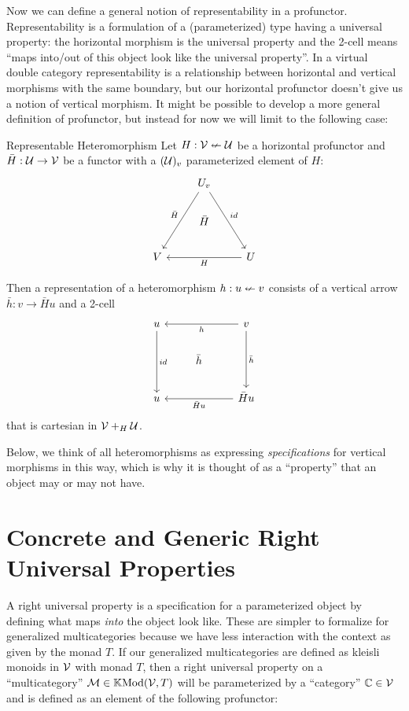 \documentclass{article}
\begin{document}
Now we can define a general notion of representability in a
profunctor.
%
Representability is a formulation of a (parameterized) type having a
universal property: the horizontal morphism is the universal property
and the 2-cell means ``maps into/out of this object look like the
universal property''.
%
In a virtual double category representability is a relationship
between horizontal and vertical morphisms with the same boundary, but
our horizontal profunctor doesn't give us a notion of vertical
morphism.
%
It might be possible to develop a more general definition of
profunctor, but instead for now we will limit to the following case:

\begin{definition}{Representable Heteromorphism}
  Let $H : \mathcal V \nleftarrow \mathcal U$ be a horizontal profunctor and
  $\bar H : \mathcal U \to \mathcal V$ be a functor with a $(\mathcal U)_v$
  parameterized element of $H$:
  \[
  \begin{tikzcd}
 & U_v \arrow[ldd, "\bar H"'] \arrow[rdd, "id"] &  \\
 & \bar H &  \\
V &  & U \arrow[ll, "H"]
\end{tikzcd}
  \]

  Then a representation of a heteromorphism $h : u \nleftarrow v$ consists
  of a vertical arrow $\bar h : v \to \bar H u$ and a 2-cell
  \[
  \begin{tikzcd}
u \arrow[dd, "id"] &  & v \arrow[dd, "\bar h"] \arrow[ll, "h"] \\
 & \bar h &  \\
u &  & \bar H u \arrow[ll, "\bar H u"]
  \end{tikzcd}
  \]
  that is cartesian in $\mathcal V +_{H} \mathcal U$.
\end{definition}

Below, we think of all heteromorphisms as expressing
\emph{specifications} for vertical morphisms in this way, which is why
it is thought of as a ``property'' that an object may or may not have.

\section{Concrete and Generic Right Universal Properties}

A right universal property is a specification for a parameterized
object by defining what maps \emph{into} the object look like.
%
These are simpler to formalize for generalized multicategories because
we have less interaction with the context as given by the monad $T$.
%
If our generalized multicategories are defined as kleisli monoids in
$\mathcal V$ with monad $T$, then a right universal property on a
``multicategory'' $\mathcal M \in \mathbb{K}\text{Mod}(\mathcal{V},T)$ will be parameterized by a
``category'' $\mathbb C \in \mathcal V$ and is defined as an element of the
following profunctor:
\end{document}
